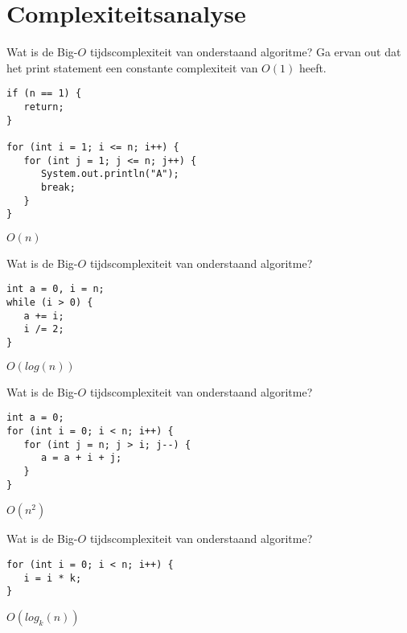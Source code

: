 \chapter{Complexiteitsanalyse}

\begin{oef}
\papier Wat is de Big-\(O\) tijdscomplexiteit van onderstaand algoritme? Ga ervan out dat het print statement een constante complexiteit van \(O(1)\) heeft.

\begin{lstlisting}
if (n == 1) {
   return;
}
   
for (int i = 1; i <= n; i++) {
   for (int j = 1; j <= n; j++) {
      System.out.println("A");
      break;
   }
}

\end{lstlisting}

\begin{opl}
\(O(n)\)
\end{opl}
\end{oef}

\begin{oef}
\papier Wat is de Big-\(O\) tijdscomplexiteit van onderstaand algoritme?

\begin{lstlisting}
int a = 0, i = n;
while (i > 0) {
   a += i;
   i /= 2;
}
\end{lstlisting}

\begin{opl}
\(O(log(n))\)
\end{opl}
\end{oef}

\break

\begin{oef}
\papier Wat is de Big-\(O\) tijdscomplexiteit van onderstaand algoritme?

\begin{lstlisting}
int a = 0;
for (int i = 0; i < n; i++) {
   for (int j = n; j > i; j--) {
      a = a + i + j;
   }
}
\end{lstlisting}

\begin{opl}
\(O(n^2)\)
\end{opl}
\end{oef}

\begin{oef}
\papier Wat is de Big-\(O\) tijdscomplexiteit van onderstaand algoritme?

\begin{lstlisting}
for (int i = 0; i < n; i++) {
   i = i * k;
}
\end{lstlisting}

\begin{opl}
\(O(log_k(n))\)
\end{opl}
\end{oef}

